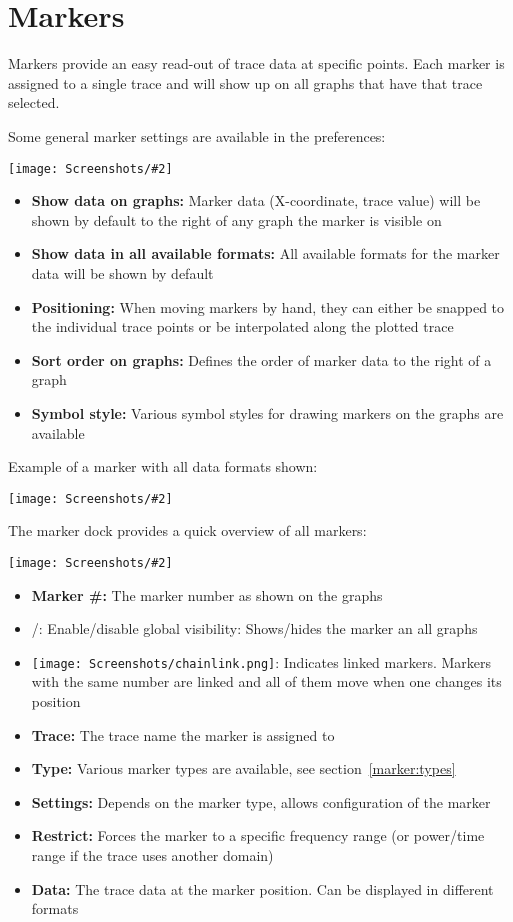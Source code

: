 \documentclass[a4paper,11pt]{article}
\newcommand{\screenshot}[2]{\begin{center}
\texttt{[image: Screenshots/\#2]}
\end{center}}
\begin{document}
\section{Markers}
Markers provide an easy read-out of trace data at specific points. Each marker is assigned to a single trace and will show up on all graphs that have that trace selected.

Some general marker settings are available in the preferences:
\screenshot{1.0}{MarkerPreferences.png}
\begin{itemize}
\item \textbf{Show data on graphs:} Marker data (X-coordinate, trace value) will be shown by default to the right of any graph the marker is visible on
\item \textbf{Show data in all available formats:} All available formats for the marker data will be shown by default
\item \textbf{Positioning:} When moving markers by hand, they can either be snapped to the individual trace points or be interpolated along the plotted trace
\item \textbf{Sort order on graphs:} Defines the order of marker data to the right of a graph
\item \textbf{Symbol style:} Various symbol styles for drawing markers on the graphs are available
\end{itemize}
\vspace{1cm}
Example of a marker with all data formats shown:
\screenshot{0.8}{MarkerExample.png}

The marker dock provides a quick overview of all markers:
\screenshot{1.0}{MarkerDock.png}
\begin{itemize}
\item \textbf{Marker \#:} The marker number as shown on the graphs
\item /: Enable/disable global visibility: Shows/hides the marker an all graphs
\item \texttt{[image: Screenshots/chainlink.png]}: Indicates linked markers. Markers with the same number are linked and all of them move when one changes its position
\item \textbf{Trace:} The trace name the marker is assigned to
\item \textbf{Type:} Various marker types are available, see section~\ref{marker:types}
\item \textbf{Settings:} Depends on the marker type, allows configuration of the marker
\item \textbf{Restrict:} Forces the marker to a specific frequency range (or power/time range if the trace uses another domain)
\item \textbf{Data:} The trace data at the marker position. Can be displayed in different formats
\end{itemize}
\end{document}
